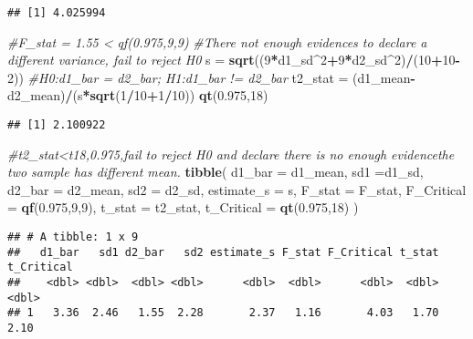 \documentclass[]{article}
\newenvironment{Shaded}{\begin{snugshade}}{\end{snugshade}}
\newcommand{\KeywordTok}[1]{\textcolor[rgb]{0.13,0.29,0.53}{\textbf{#1}}}
\newcommand{\DataTypeTok}[1]{\textcolor[rgb]{0.13,0.29,0.53}{#1}}
\newcommand{\DecValTok}[1]{\textcolor[rgb]{0.00,0.00,0.81}{#1}}
\newcommand{\FloatTok}[1]{\textcolor[rgb]{0.00,0.00,0.81}{#1}}
\newcommand{\StringTok}[1]{\textcolor[rgb]{0.31,0.60,0.02}{#1}}
\newcommand{\CommentTok}[1]{\textcolor[rgb]{0.56,0.35,0.01}{\textit{#1}}}
\newcommand{\OperatorTok}[1]{\textcolor[rgb]{0.81,0.36,0.00}{\textbf{#1}}}
\newcommand{\NormalTok}[1]{#1}
\begin{document}
\begin{verbatim}
## [1] 4.025994
\end{verbatim}

\begin{Shaded}
\begin{Highlighting}[]
\CommentTok{#F_stat = 1.55 < qf(0.975,9,9)}
\CommentTok{#There not enough evidences to declare a different variance, fail to reject H0}
\NormalTok{s =}\StringTok{ }\KeywordTok{sqrt}\NormalTok{((}\DecValTok{9}\OperatorTok{*}\NormalTok{d1_sd}\OperatorTok{^}\DecValTok{2}\OperatorTok{+}\DecValTok{9}\OperatorTok{*}\NormalTok{d2_sd}\OperatorTok{^}\DecValTok{2}\NormalTok{)}\OperatorTok{/}\NormalTok{(}\DecValTok{10}\OperatorTok{+}\DecValTok{10}\OperatorTok{-}\DecValTok{2}\NormalTok{))}
 \CommentTok{#H0:d1_bar = d2_bar; H1:d1_bar != d2_bar}
\NormalTok{t2_stat =}\StringTok{ }\NormalTok{(d1_mean}\OperatorTok{-}\NormalTok{d2_mean)}\OperatorTok{/}\NormalTok{(s}\OperatorTok{*}\KeywordTok{sqrt}\NormalTok{(}\DecValTok{1}\OperatorTok{/}\DecValTok{10}\OperatorTok{+}\DecValTok{1}\OperatorTok{/}\DecValTok{10}\NormalTok{))}
\KeywordTok{qt}\NormalTok{(}\FloatTok{0.975}\NormalTok{,}\DecValTok{18}\NormalTok{)}
\end{Highlighting}
\end{Shaded}

\begin{verbatim}
## [1] 2.100922
\end{verbatim}

\begin{Shaded}
\begin{Highlighting}[]
\CommentTok{#t2_stat<t18,0.975,fail to reject H0 and declare there is no enough evidencethe two sample has different mean.}
\KeywordTok{tibble}\NormalTok{(}
  \DataTypeTok{d1_bar =}\NormalTok{ d1_mean,}
  \DataTypeTok{sd1 =}\NormalTok{d1_sd,}
  \DataTypeTok{d2_bar =}\NormalTok{ d2_mean,}
  \DataTypeTok{sd2 =}\NormalTok{ d2_sd,}
  \DataTypeTok{estimate_s =}\NormalTok{ s,}
  \DataTypeTok{F_stat =}\NormalTok{ F_stat,}
  \DataTypeTok{F_Critical =} \KeywordTok{qf}\NormalTok{(}\FloatTok{0.975}\NormalTok{,}\DecValTok{9}\NormalTok{,}\DecValTok{9}\NormalTok{),}
  \DataTypeTok{t_stat =}\NormalTok{ t2_stat,}
  \DataTypeTok{t_Critical =} \KeywordTok{qt}\NormalTok{(}\FloatTok{0.975}\NormalTok{,}\DecValTok{18}\NormalTok{)}
\NormalTok{)}
\end{Highlighting}
\end{Shaded}

\begin{verbatim}
## # A tibble: 1 x 9
##   d1_bar   sd1 d2_bar   sd2 estimate_s F_stat F_Critical t_stat t_Critical
##    <dbl> <dbl>  <dbl> <dbl>      <dbl>  <dbl>      <dbl>  <dbl>      <dbl>
## 1   3.36  2.46   1.55  2.28       2.37   1.16       4.03   1.70       2.10
\end{verbatim}
\end{document}
